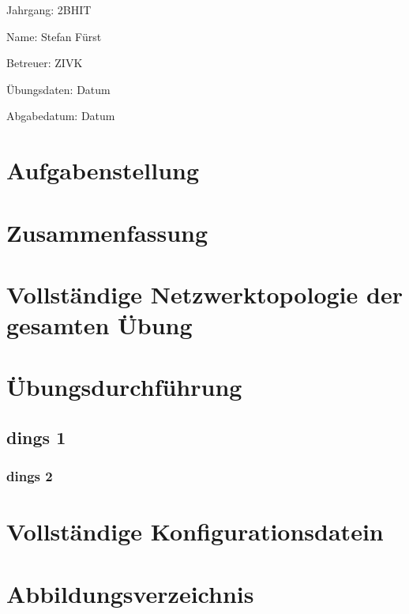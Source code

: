 \documentclass[a4paper]{article}
\begin{document}
Jahrgang:	2BHIT

Name:	Stefan Fürst

Betreuer: 	ZIVK

Übungsdaten:	Datum

Abgabedatum:	Datum


\newpage
\tableofcontents

\newpage

\section{Aufgabenstellung}

\section{Zusammenfassung}

\newpage

\section{Vollständige Netzwerktopologie der gesamten Übung}

\newpage

\section{Übungsdurchführung}

\subsection{dings 1}

\subsubsection{dings 2}

\newpage

\section{Vollständige Konfigurationsdatein}

\newpage

\section{Abbildungsverzeichnis}

\listoffigures
\end{document}
